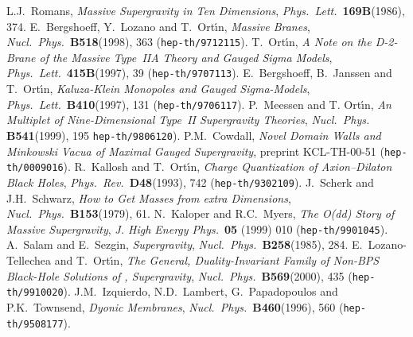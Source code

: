 \documentclass[12pt,a4paper]{article}
\begin{document}
\begin{thebibliography}{50}

 L.J.~Romans,
        {\sl Massive \coordHE{} Supergravity in Ten Dimensions},
        {\it Phys.~Lett.}~{\bf 169B}(1986), 374.
%
 E.~Bergshoeff, Y.~Lozano and T.~Ort\'{\i}n,
        {\sl Massive Branes},
        {\it Nucl.~Phys.}~{\bf B518}(1998), 363 ({\tt hep-th/9712115}). 
%
 T.~Ort\'{\i}n,
        {\sl A Note on the D-2-Brane of the Massive 
             Type~IIA Theory and Gauged Sigma Models},
      {\it Phys.~Lett.}~{\bf 415B}(1997), 39 ({\tt hep-th/9707113}).
%
 E.~Bergshoeff, B.~Janssen and T.~Ort\'{\i}n,
        {\sl Kaluza-Klein Monopoles and  Gauged Sigma-Models},
        {\it Phys.~Lett.}~{\bf B410}(1997), 131 ({\tt hep-th/9706117}).
%
 P.~Meessen and T. Ort\'{\i}n,
        {\sl An \coordHE{} Multiplet of Nine-Dimensional 
        Type~II Supergravity Theories},
        {\it Nucl.~Phys.}~ {\bf B541}(1999), 195 {\tt hep-th/9806120}).
%
 P.M.~Cowdall, 
        {\sl Novel Domain Walls and Minkowski Vacua of \coordHE{}
             Maximal \coordHE{} Gauged Supergravity},
        preprint KCL-TH-00-51 ({\tt hep-th/0009016}).
%
 R.~Kallosh and T.~Ort\'{\i}n,
     {\sl Charge Quantization of Axion--Dilaton Black Holes},
     {\it Phys.~Rev.}~{\bf D48}(1993), 742 ({\tt hep-th/9302109}).
%
 J.~Scherk and J.H.~Schwarz,
        {\sl How to Get Masses from extra Dimensions},
        {\it Nucl.~Phys.}~{\bf B153}(1979), 61.
%
 N.~Kaloper and R.C.~Myers,
        {\sl The O(dd) Story of Massive Supergravity},
  {\it J. High Energy Phys.}~{\bf 05} (1999) 010 ({\tt hep-th/9901045}).
%
 A.~Salam and E.~Sezgin,
        {\sl {}\coordHE{} Supergravity},
        {\it Nucl.~Phys.}~{\bf B258}(1985), 284. 
%
 E.~Lozano-Tellechea and T.~Ort\'{\i}n,
        {\sl The General, Duality-Invariant Family of Non-BPS
              Black-Hole Solutions of  \coordHE{}, \coordHE{} Supergravity},
        {\it Nucl.~Phys.}~{\bf B569}(2000), 435 ({\tt hep-th/9910020}).
%
 J.M.~Izquierdo, N.D.~Lambert, G.~Papadopoulos and 
                  P.K.~Townsend,
        {\sl Dyonic Membranes},
        {\it Nucl.~Phys.}~{\bf B460}(1996), 560 ({\tt hep-th/9508177}).

\end{thebibliography}
\end{document}
